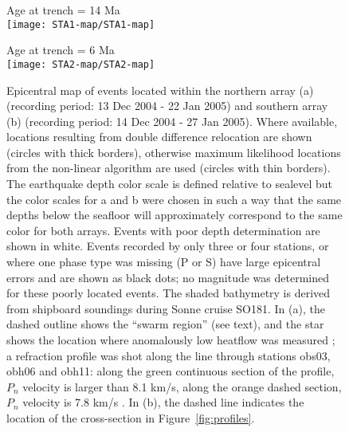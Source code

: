 \documentclass[reviewcopy]{elsarticle}
\renewcommand{\includegraphics}[2][]{\fbox{#2}}
\begin{document}
\begin{figure}
\begin{minipage}[t]{0.49\textwidth}
{ Age at trench = 14 Ma} \\
\texttt{[image: STA1-map/STA1-map]}
\end{minipage}\hfill%
\begin{minipage}[t]{0.49\textwidth}
{  Age at trench = 6 Ma} \\
\texttt{[image: STA2-map/STA2-map]}
\end{minipage}

\caption{Epicentral map of events located within the northern array
  (a) (recording period: 13 Dec 2004 - 22 Jan 2005) and southern array
  (b)  (recording period: 14 Dec 2004 - 27 Jan 2005). Where available, locations resulting
  from double difference relocation are shown (circles with thick
  borders), otherwise maximum likelihood locations from the non-linear
   algorithm are used (circles with thin borders).
  The earthquake depth color scale is defined relative to sealevel but
  the color scales for a and b were chosen in such a way that the same depths
  below the seafloor will approximately correspond to the same color
  for both arrays.    Events
  with poor depth determination are shown in white. Events recorded by
  only three or four stations, or where one phase type was missing (P
  or S) have large epicentral errors and are shown as black dots; no
  magnitude was determined for these poorly located events.
  The shaded bathymetry is derived from shipboard
soundings during Sonne cruise SO181.
In (a), the dashed outline shows the ``swarm
region'' (see text), and the star shows the location where anomalously
low heatflow was measured \citep{contreras-reyes07}; a refraction profile was shot along the line through stations obs03, obh06 and
obh11: along the green continuous section of the profile, $P_n$ velocity is larger than
8.1 km/s, along the orange dashed section, $P_n$ velocity is 7.8 km/s
\citep{contreras-reyes07}. In (b), the dashed line indicates the location of the
cross-section in Figure~\protect\ref{fig:profiles}.}
\label{fig:epimaps}
\end{figure}
\end{document}
